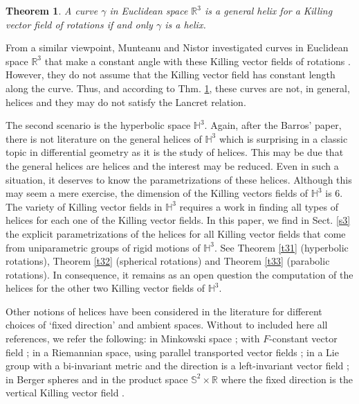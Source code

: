 \documentclass[a4paper,12pt]{amsart}
\newtheorem{theorem}{Theorem}[section]
\theoremstyle{definition}
\def\r{\mathbb R}
\def\h{\mathbb H}
\def\s{\mathbb S}
\begin{document}
 \begin{theorem} \label{te0}
A curve $\gamma$ in  Euclidean space $\r^3$ is a general helix for a Killing vector field  of rotations if and only  $\gamma$ is a helix. 
\end{theorem} 

From a similar viewpoint, Munteanu and Nistor investigated     curves in Euclidean space $\r^3$ that make a constant angle with these Killing vector fields of rotations \cite{mn}. However, they do not assume that the Killing vector field has constant length along the curve. Thus, and according to Thm. \ref{te0}, these curves  are not, in general, helices and   they may do not satisfy the Lancret relation.

The second scenario is the hyperbolic space $\h^3$. Again, after the Barros' paper, there is not literature on the general helices of $\h^3$ which is surprising  in a classic topic in differential geometry as it is the study of helices. This may be due that   the general helices are helices and the interest may be reduced.   Even in such a situation, it deserves to know the parametrizations of these helices.   Although this may seem a mere exercise, the dimension of the Killing vectors fields of $\h^3$ is $6$. The variety of Killing vector fields in $\h^3$   requires a work in finding all types of helices for each one of the Killing vector fields.  In this paper, we find in Sect. \ref{s3} the explicit parametrizations of the helices for all Killing vector fields that come from uniparametric groups of rigid motions of $\h^3$.  See Theorem \ref{t31} (hyperbolic rotations), Theorem \ref{t32} (spherical rotations) and Theorem \ref{t33} (parabolic rotations). In consequence, it remains as an open question  the computation of the helices for the other two Killing vector fields of $\h^3$.

  
   
Other notions of helices have been considered in the literature for different choices of `fixed direction' and ambient spaces. Without to included here all references, we refer the following: in Minkowski space \cite{fgl}; with $F$-constant vector field \cite{ly};  in a Riemannian space, using parallel transported vector fields \cite{da,ha};  in a Lie group with a bi-invariant metric and  the direction is a left-invariant vector field \cite{ci}; in Berger spheres and in the product space $\s^2\times\r$  where the fixed direction is the vertical  Killing vector field \cite{mo,ni}.
 
 
\end{document}
